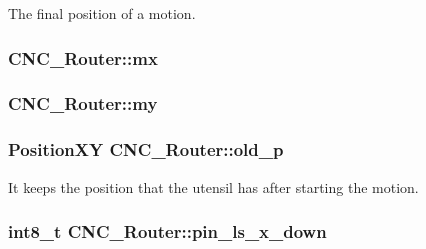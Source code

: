 The final position of a motion. 

\hypertarget{class_c_n_c___router_aa6009653314607491aa277b1f3c9bf85}{
\subsubsection[{mx}]{ C\+N\+C\+\_\+\+Router\+::mx\hspace{0.3cm}{\ttfamily [private]}}}\label{class_c_n_c___router_aa6009653314607491aa277b1f3c9bf85}
\hypertarget{class_c_n_c___router_ac3fb4521615d90ff7baa6bdb287d97c9}{
\subsubsection[{my}]{ C\+N\+C\+\_\+\+Router\+::my\hspace{0.3cm}{\ttfamily [private]}}}\label{class_c_n_c___router_ac3fb4521615d90ff7baa6bdb287d97c9}
\hypertarget{class_c_n_c___router_adbaa016d11134c9dcef28fc38ff391e1}{
\subsubsection[{old\+\_\+p}]{\setlength{\rightskip}{0pt plus 5cm}Position\+X\+Y C\+N\+C\+\_\+\+Router\+::old\+\_\+p\hspace{0.3cm}{\ttfamily [private]}}}\label{class_c_n_c___router_adbaa016d11134c9dcef28fc38ff391e1}


It keeps the position that the utensil has after starting the motion. 

\hypertarget{class_c_n_c___router_a109a7c6e2a1e556e577f2ad09eefbef7}{
\subsubsection[{pin\+\_\+ls\+\_\+x\+\_\+down}]{\setlength{\rightskip}{0pt plus 5cm}int8\+\_\+t C\+N\+C\+\_\+\+Router\+::pin\+\_\+ls\+\_\+x\+\_\+down\hspace{0.3cm}{\ttfamily [private]}}}\label{class_c_n_c___router_a109a7c6e2a1e556e577f2ad09eefbef7}


